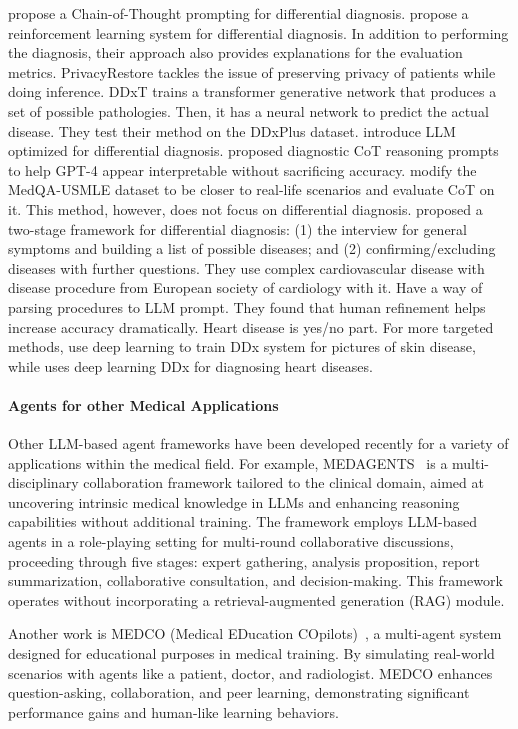 

\citet{wu2023large} propose a Chain-of-Thought prompting for differential diagnosis. \citet{fansi2022towards} propose a reinforcement learning system for differential diagnosis. In addition to performing the diagnosis, their approach also provides explanations for the evaluation metrics. PrivacyRestore \cite{zeng2024privacyrestore} tackles the issue of preserving privacy of patients while doing inference. DDxT \cite{alam2023ddxt} trains a transformer generative network that produces a set of possible pathologies. Then, it has a neural network to predict the actual disease. They test their method on the DDxPlus dataset. \citet{reese2024limitations} introduce LLM optimized for differential diagnosis. \cite{savage2024diagnostic} proposed diagnostic CoT reasoning prompts to help GPT-4 appear interpretable without sacrificing accuracy. \citet{nachane2024few} modify the MedQA-USMLE dataset to be closer to real-life scenarios and evaluate CoT on it. This method, however, does not focus on differential diagnosis. \citet{sun2024conversational} proposed a two-stage framework for differential diagnosis: (1)  the interview for general symptoms and building a list of possible diseases; and (2) confirming/excluding diseases with further questions. They use complex cardiovascular disease with disease procedure from European society of cardiology with it. Have a way of parsing procedures to LLM prompt. They found that human refinement helps increase accuracy dramatically. Heart disease is yes/no part. For more targeted methods, \cite{liu2020deep} use deep learning to train DDx system for pictures of skin disease, while \cite{hwang2022differential} uses deep learning DDx for diagnosing heart diseases.



\paragraph{Agents for other Medical Applications} Other LLM-based agent frameworks have been developed recently for a variety of applications within the medical field. For example, MEDAGENTS~\citep{tang-etal-2024-medagents}  is a multi-disciplinary collaboration framework tailored to the clinical domain, aimed at uncovering intrinsic medical knowledge in LLMs and enhancing reasoning capabilities without additional training. The framework employs LLM-based agents in a role-playing setting for multi-round collaborative discussions, proceeding through five stages: expert gathering, analysis proposition, report summarization, collaborative consultation, and decision-making. This framework operates without incorporating a retrieval-augmented generation (RAG) module.



Another work is MEDCO (Medical EDucation COpilots)~\citep{wei2024medco}, a multi-agent system designed for educational purposes in medical training. By simulating real-world scenarios with agents like a patient, doctor, and radiologist. MEDCO enhances question-asking, collaboration, and peer learning, demonstrating significant performance gains and human-like learning behaviors.